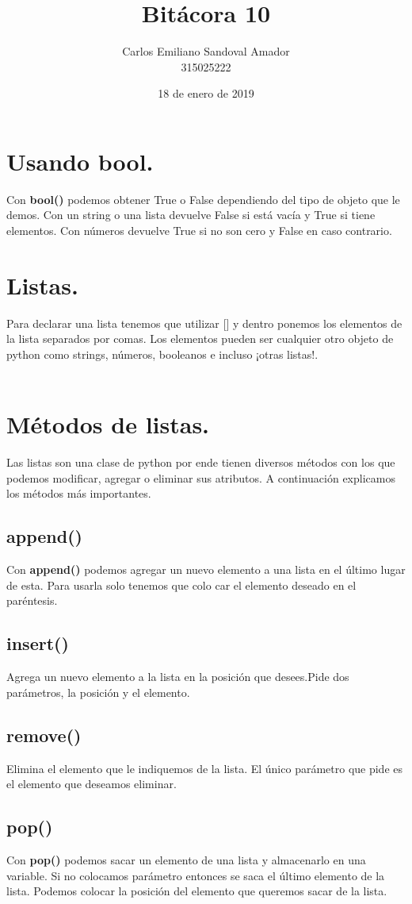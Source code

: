 \documentclass[letterpaper, 12pt, oneside]{article}%
\title{Bitácora 10}
\author{Carlos Emiliano Sandoval Amador \\ 315025222}
\date{18 de enero de 2019}
\begin{document}
	\maketitle
	\section{\large Usando bool.}
	Con \textbf{bool()} podemos obtener True o False dependiendo del tipo de objeto que le demos. Con un string o una lista devuelve False si está vacía y True si tiene elementos. Con números devuelve True si no son cero y False en caso contrario.
	\section{\large Listas.}
	Para declarar una lista tenemos que utilizar [] y dentro ponemos los elementos de la lista separados por comas. Los elementos pueden ser cualquier otro objeto de python como strings, números, booleanos e incluso ¡otras listas!. \\ \\
	\section{Métodos de listas.}
	Las listas son una clase de python por ende tienen diversos métodos con los que podemos modificar, agregar o eliminar sus atributos. A continuación explicamos los métodos más importantes.
	\subsection{append()}
	Con \textbf{append()} podemos agregar un  nuevo elemento a una lista en el último lugar de esta. Para usarla solo tenemos que colo car el elemento deseado en el paréntesis.
	\subsection{insert()}
	Agrega un nuevo elemento a la lista en la posición que desees.Pide dos parámetros, la posición y el elemento.
	\subsection{remove()}
	Elimina el elemento que le indiquemos de la lista. El único parámetro que pide es el elemento que deseamos eliminar.
	\subsection{pop()}
	Con \textbf{pop()} podemos sacar un elemento de una lista y almacenarlo en una variable. Si no colocamos parámetro entonces se saca el último elemento de la lista. Podemos colocar la posición del elemento que queremos sacar de la lista.
\end{document}
